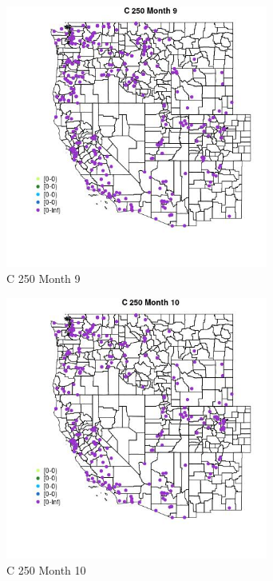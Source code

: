 \begin{figure} 
\centering  
\includegraphics[width=0.77\textwidth]{Code_Outputs/Report_ML_input_PM25_Step4_part_e_de_duplicated_aveswNAs_MapObsMo9C_250.jpg} 
\caption{\label{fig:Report_ML_input_PM25_Step4_part_e_de_duplicated_aveswNAsMapObsMo9C_250}C 250 Month 9} 
\end{figure} 
 

\clearpage 

\begin{figure} 
\centering  
\includegraphics[width=0.77\textwidth]{Code_Outputs/Report_ML_input_PM25_Step4_part_e_de_duplicated_aveswNAs_MapObsMo10C_250.jpg} 
\caption{\label{fig:Report_ML_input_PM25_Step4_part_e_de_duplicated_aveswNAsMapObsMo10C_250}C 250 Month 10} 
\end{figure} 
 

